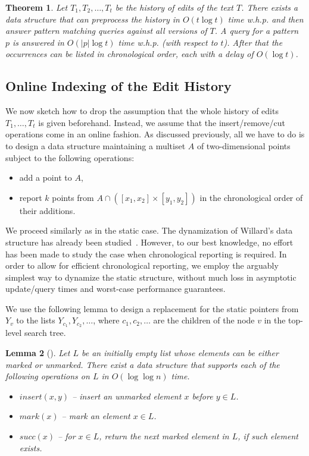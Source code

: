 \documentclass[a4paper]{article}
\newtheorem{theorem}{Theorem}[section]
\newtheorem{lemma}[theorem]{Lemma}
\theoremstyle{remark}
\begin{document}
\begin{theorem}
Let $T_1,T_2,\ldots,T_t$ be the history of edits of the text $T$.
There exists a data structure that can preprocess the history in $O(t \log t)$ time w.h.p. and then answer pattern matching queries against all versions of $T$. A query for a pattern $p$ is answered in $O(|p|\log t)$ time w.h.p. (with respect to $t$).
After that the occurrences can be listed in chronological order, each with a delay of $O(\log t)$.
\end{theorem}

\subsection{Online Indexing of the Edit History}
We now sketch how to drop the assumption
that the whole history of edits $T_1,\ldots,T_t$ is given beforehand.
Instead, we assume that the insert/remove/cut operations
come in an online fashion.
As discussed previously, all we have to do is to design a data structure
maintaining a multiset $A$ of two-dimensional points subject to the following
operations:
\begin{itemize}
\item add a point to $A$,
\item report $k$ points from $A\cap([x_1,x_2]\times [y_1,y_2])$
  in the chronological order of their additions.
\end{itemize}
We proceed similarly as in the static case.
The dynamization of Willard's data structure has already been
studied~\cite{Dietz:1991,Mehlhorn:1990,Mortensen:2003}.
However, to our best knowledge, no effort has been made
to study the case when chronological reporting is required.
In order to allow for efficient chronological reporting,
we employ the arguably simplest way to dynamize
the static structure, without much loss in asymptotic update/query times
and worst-case performance guarantees.

We use the following lemma to design a replacement for
the static pointers from
$Y_v$ to the lists $Y_{c_1},Y_{c_2},\ldots$, where $c_1,c_2,\ldots$
are the children of the node $v$ in the top-level search tree.

\begin{lemma}[\cite{Dietz:1991}]\label{lem:mark}
Let $L$ be an initially empty list whose elements can be either
\emph{marked} or \emph{unmarked}.
There exist a data structure that supports each of the following
operations on $L$ in $O(\log{\log{n}})$ time.
\begin{itemize}
\item $insert(x,y)$ -- insert an unmarked element $x$ before $y\in L$.
\item $mark(x)$ -- mark an element $x\in L$.
\item $succ(x)$ -- for $x\in L$, return the next marked element in $L$,
  if such element exists.
\end{itemize}
\end{lemma}
\end{document}

